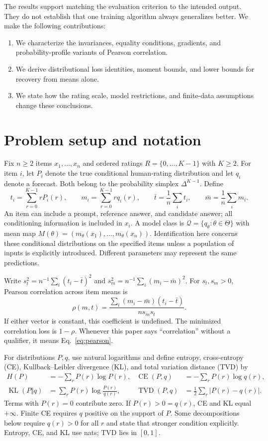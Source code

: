 \documentclass[11pt,letterpaper]{article}
\newcommand{\CE}{\operatorname{CE}}
\newcommand{\KL}{\operatorname{KL}}
\newcommand{\TV}{\operatorname{TVD}}
\begin{document}
The results support matching the evaluation criterion to the intended output.
They do not establish that one training algorithm always generalizes better.
We make the following contributions:
\begin{enumerate}
\item We characterize the invariances, equality conditions, gradients, and probability-profile variants of Pearson correlation.
\item We derive distributional loss identities, moment bounds, and lower bounds for recovery from means alone.
\item We state how the rating scale, model restrictions, and finite-data assumptions change these conclusions.
\end{enumerate}

\section{Problem setup and notation}
Fix $n\ge2$ items $x_1,\ldots,x_n$ and ordered ratings $R=\{0,\ldots,K-1\}$ with $K\ge2$.
For item $i$, let $P_i$ denote the true conditional human-rating distribution and let $q_i$ denote a forecast.
Both belong to the probability simplex $\Delta^{K-1}$.
Define
\[
 t_i=\sum_{r=0}^{K-1}rP_i(r),\qquad
 m_i=\sum_{r=0}^{K-1}rq_i(r),\qquad
 \bar t=\frac1n\sum_i t_i,\qquad \bar m=\frac1n\sum_i m_i.
\]
An item can include a prompt, reference answer, and candidate answer; all conditioning information is included in $x_i$.
A model class is $\mathcal Q=\{q_\theta:\theta\in\Theta\}$ with mean map $M(\theta)=(m_\theta(x_1),\ldots,m_\theta(x_n))$.
Identification here concerns these conditional distributions on the specified items unless a population of inputs is explicitly introduced.
Different parameters may represent the same predictions.

Write $s_t^2=n^{-1}\sum_i(t_i-\bar t)^2$ and $s_m^2=n^{-1}\sum_i(m_i-\bar m)^2$.
For $s_t,s_m>0$, Pearson correlation across item means is
\begin{equation}\label{eq:pearson}
 \rho(m,t)=\frac{\sum_i(m_i-\bar m)(t_i-\bar t)}{n s_m s_t}.
\end{equation}
If either vector is constant, this coefficient is undefined.
The minimized correlation loss is $1-\rho$.
Whenever this paper says ``correlation'' without a qualifier, it means Eq.~\eqref{eq:pearson}.

For distributions $P,q$, use natural logarithms and define entropy, cross-entropy (CE), Kullback--Leibler divergence (KL), and total variation distance (TVD) by
\begin{align}
 H(P)&=-\sum_r P(r)\log P(r), &
 \CE(P,q)&=-\sum_r P(r)\log q(r),\\
 \KL(P\Vert q)&=\sum_r P(r)\log\frac{P(r)}{q(r)}, &
 \TV(P,q)&=\frac12\sum_r|P(r)-q(r)|.
\end{align}
Terms with $P(r)=0$ contribute zero.
If $P(r)>0=q(r)$, CE and KL equal $+\infty$.
Finite CE requires $q$ positive on the support of $P$.
Some decompositions below require $q(r)>0$ for all $r$ and state that stronger condition explicitly.
Entropy, CE, and KL use nats; TVD lies in $[0,1]$.
\end{document}
